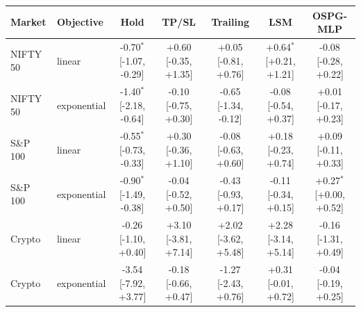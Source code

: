 \begin{tabular}{llccccc}
\toprule
Market & Objective & Hold & TP/SL & Trailing & LSM & OSPG-MLP \\
\midrule
NIFTY 50 & linear & -0.70$^{*}$ [-1.07, -0.29] & +0.60 [-0.35, +1.35] & +0.05 [-0.81, +0.76] & +0.64$^{*}$ [+0.21, +1.21] & -0.08 [-0.28, +0.22] \\
NIFTY 50 & exponential & -1.40$^{*}$ [-2.18, -0.64] & -0.10 [-0.75, +0.30] & -0.65 [-1.34, -0.12] & -0.08 [-0.54, +0.37] & +0.01 [-0.17, +0.23] \\
S\&P 100 & linear & -0.55$^{*}$ [-0.73, -0.33] & +0.30 [-0.36, +1.10] & -0.08 [-0.63, +0.60] & +0.18 [-0.23, +0.74] & +0.09 [-0.11, +0.33] \\
S\&P 100 & exponential & -0.90$^{*}$ [-1.49, -0.38] & -0.04 [-0.52, +0.50] & -0.43 [-0.93, +0.17] & -0.11 [-0.34, +0.15] & +0.27$^{*}$ [+0.00, +0.52] \\
Crypto & linear & -0.26 [-1.10, +0.40] & +3.10 [-3.81, +7.14] & +2.02 [-3.62, +5.48] & +2.28 [-3.14, +5.14] & -0.16 [-1.31, +0.49] \\
Crypto & exponential & -3.54 [-7.92, +3.77] & -0.18 [-0.66, +0.47] & -1.27 [-2.43, +0.76] & +0.31 [-0.01, +0.72] & -0.04 [-0.19, +0.25] \\
\bottomrule
\end{tabular}
